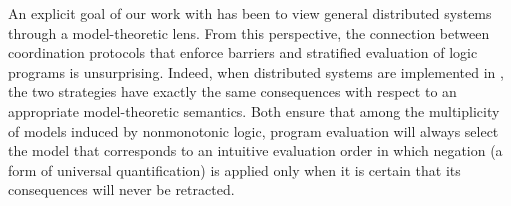 An explicit goal of our work with \lang has been to view general distributed
systems through a model-theoretic lens.  From this perspective, the connection
between coordination protocols that enforce barriers and stratified evaluation
of logic programs is unsurprising.  Indeed, when distributed systems are
implemented in \plang, the two strategies have exactly the same consequences
with respect to an appropriate model-theoretic semantics. Both ensure that among
the multiplicity of models induced by nonmonotonic logic, program evaluation
will always select the model that corresponds to an intuitive evaluation order
in which negation (a form of universal quantification) is applied only when it
is certain that its consequences will never be retracted.



